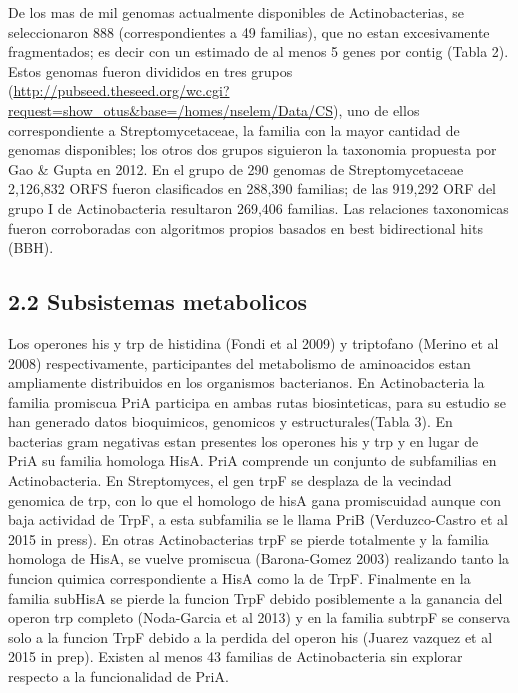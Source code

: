 \documentclass[12pt,twoside]{reedthesis}
\begin{document}
  De los mas de mil genomas actualmente disponibles de Actinobacterias, se
  seleccionaron 888 (correspondientes a 49 familias), que no estan
  excesivamente fragmentados; es decir con un estimado de al menos 5 genes
  por contig (Tabla 2). Estos genomas fueron divididos en tres grupos
  (\url{http://pubseed.theseed.org/wc.cgi?request=show_otus\&base=/homes/nselem/Data/CS}),
  uno de ellos correspondiente a Streptomycetaceae, la familia con la
  mayor cantidad de genomas disponibles; los otros dos grupos siguieron la
  taxonomia propuesta por Gao \& Gupta en 2012. En el grupo de 290 genomas
  de Streptomycetaceae 2,126,832 ORFS fueron clasificados en 288,390
  familias; de las 919,292 ORF del grupo I de Actinobacteria resultaron
  269,406 familias. Las relaciones taxonomicas fueron corroboradas con
  algoritmos propios basados en best bidirectional hits (BBH).
  
  \subsection{2.2 Subsistemas metabolicos}\label{subsistemas-metabolicos}
  
  Los operones his y trp de histidina (Fondi et al 2009) y triptofano
  (Merino et al 2008) respectivamente, participantes del metabolismo de
  aminoacidos estan ampliamente distribuidos en los organismos
  bacterianos. En Actinobacteria la familia promiscua PriA participa en
  ambas rutas biosinteticas, para su estudio se han generado datos
  bioquimicos, genomicos y estructurales(Tabla 3). En bacterias gram
  negativas estan presentes los operones his y trp y en lugar de PriA su
  familia homologa HisA. PriA comprende un conjunto de subfamilias en
  Actinobacteria. En Streptomyces, el gen trpF se desplaza de la vecindad
  genomica de trp, con lo que el homologo de hisA gana promiscuidad aunque
  con baja actividad de TrpF, a esta subfamilia se le llama PriB
  (Verduzco-Castro et al 2015 in press). En otras Actinobacterias trpF se
  pierde totalmente y la familia homologa de HisA, se vuelve promiscua
  (Barona-Gomez 2003) realizando tanto la funcion quimica correspondiente
  a HisA como la de TrpF. Finalmente en la familia subHisA se pierde la
  funcion TrpF debido posiblemente a la ganancia del operon trp completo
  (Noda-Garcia et al 2013) y en la familia subtrpF se conserva solo a la
  funcion TrpF debido a la perdida del operon his (Juarez vazquez et al
  2015 in prep). Existen al menos 43 familias de Actinobacteria sin
  explorar respecto a la funcionalidad de PriA.
  
\end{document}
